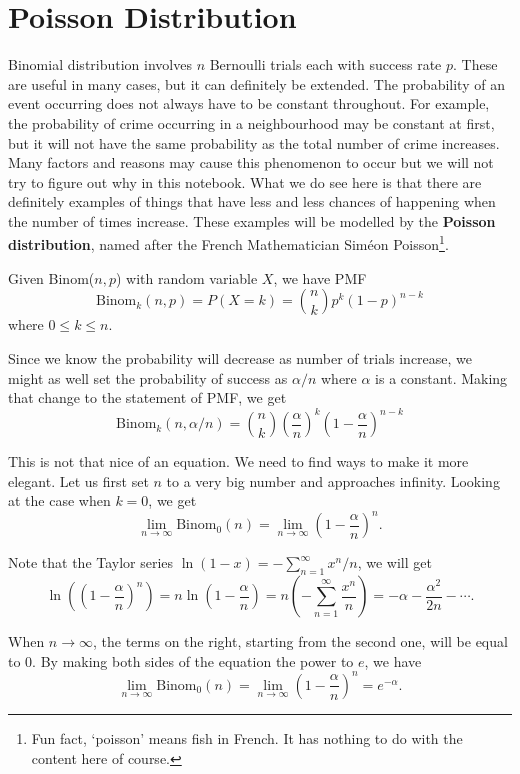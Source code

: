 \documentclass[11pt, a4paper, oneside]{book}
\theoremstyle{definition}
\begin{document}
\section{Poisson Distribution}

\noindent Binomial distribution involves $n$ Bernoulli trials each with success rate $p$. These are useful in many cases, but it can definitely be extended. The probability of an event occurring does not always have to be constant throughout. For example, the probability of crime occurring in a neighbourhood may be constant at first, but it will not have the same probability as the total number of crime increases. Many factors and reasons may cause this phenomenon to occur but we will not try to figure out why in this notebook. What we do see here is that there are definitely examples of things that have less and less chances of happening when the number of times increase. These examples will be modelled by the \textbf{Poisson distribution}, named after the French Mathematician Siméon Poisson\footnote{Fun fact, `poisson' means fish in French. It has nothing to do with the content here of course.}. 

\noindent Given Binom($n,p$) with random variable $X$, we have PMF \[
\text{Binom}_k(n,p) = P(X= k) = {n \choose k}p^k (1-p)^{n-k}
\]
where $0 \le k \le n$.

\noindent Since we know the probability will decrease as number of trials increase, we might as well set the probability of success as $\alpha/n$ where $\alpha$ is a constant. Making that change to the statement of PMF, we get\[
\text{Binom}_k(n,{\alpha}/{n}) = {n \choose k}(\frac{\alpha}{n})^k (1-\frac{\alpha}{n})^{n-k}
\]

\noindent This is not that nice of an equation. We need to find ways to make it more elegant. Let us first set $n$ to  a very big number and approaches infinity. Looking at the case when $k=0$, we get\[
\lim_{n \to \infty} \text{Binom}_0(n) = \lim_{n \to \infty} (1-\frac{\alpha}{n})^{n}.
\]

\noindent Note that the Taylor series $\ln (1-x) = - \sum^{\infty}_{n=1} x^n / n$, we will get
\[
\ln ((1-\frac{\alpha}{n})^{n}) = n \ln (1-\frac{\alpha}{n}) = n(- \sum^{\infty}_{n=1} \frac{x^n}{n}) = -\alpha - \frac{\alpha^2}{2n} - \cdots.
\]

\noindent When $n \to \infty$, the terms on the right, starting from the second one, will be equal to 0. By making both sides of the equation the power to $e$, we have
\[
\lim_{n \to \infty} \text{Binom}_0(n) = \lim_{n \to \infty} (1-\frac{\alpha}{n})^{n} = e^{-\alpha}.
\]
\end{document}
